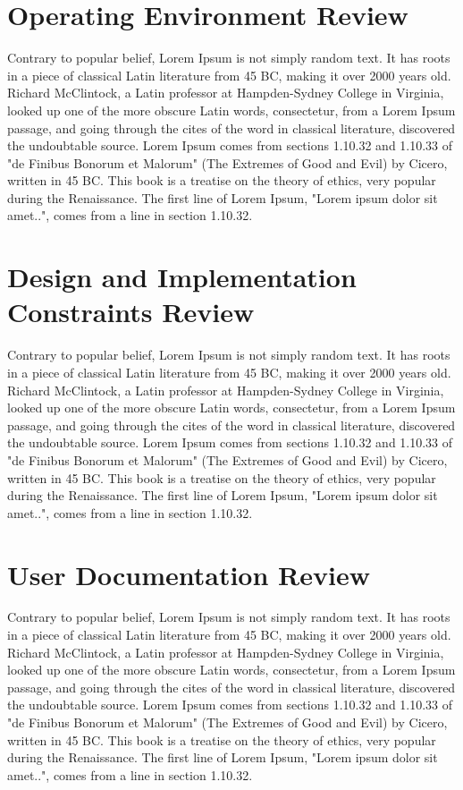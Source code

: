 \documentclass{scrreprt}
\begin{document}
    \section{Operating Environment Review}
    Contrary to popular belief, Lorem Ipsum is not simply random text. It has roots in a piece of classical Latin literature from 45 BC, making it over 2000 years old. Richard McClintock, a Latin professor at Hampden-Sydney College in Virginia, looked up one of the more obscure Latin words, consectetur, from a Lorem Ipsum passage, and going through the cites of the word in classical literature, discovered the undoubtable source. Lorem Ipsum comes from sections 1.10.32 and 1.10.33 of "de Finibus Bonorum et Malorum" (The Extremes of Good and Evil) by Cicero, written in 45 BC. This book is a treatise on the theory of ethics, very popular during the Renaissance. The first line of Lorem Ipsum, "Lorem ipsum dolor sit amet..", comes from a line in section 1.10.32.
    \section{Design and Implementation Constraints Review}
    Contrary to popular belief, Lorem Ipsum is not simply random text. It has roots in a piece of classical Latin literature from 45 BC, making it over 2000 years old. Richard McClintock, a Latin professor at Hampden-Sydney College in Virginia, looked up one of the more obscure Latin words, consectetur, from a Lorem Ipsum passage, and going through the cites of the word in classical literature, discovered the undoubtable source. Lorem Ipsum comes from sections 1.10.32 and 1.10.33 of "de Finibus Bonorum et Malorum" (The Extremes of Good and Evil) by Cicero, written in 45 BC. This book is a treatise on the theory of ethics, very popular during the Renaissance. The first line of Lorem Ipsum, "Lorem ipsum dolor sit amet..", comes from a line in section 1.10.32.
    \section{User Documentation Review}
    Contrary to popular belief, Lorem Ipsum is not simply random text. It has roots in a piece of classical Latin literature from 45 BC, making it over 2000 years old. Richard McClintock, a Latin professor at Hampden-Sydney College in Virginia, looked up one of the more obscure Latin words, consectetur, from a Lorem Ipsum passage, and going through the cites of the word in classical literature, discovered the undoubtable source. Lorem Ipsum comes from sections 1.10.32 and 1.10.33 of "de Finibus Bonorum et Malorum" (The Extremes of Good and Evil) by Cicero, written in 45 BC. This book is a treatise on the theory of ethics, very popular during the Renaissance. The first line of Lorem Ipsum, "Lorem ipsum dolor sit amet..", comes from a line in section 1.10.32.
\end{document}
